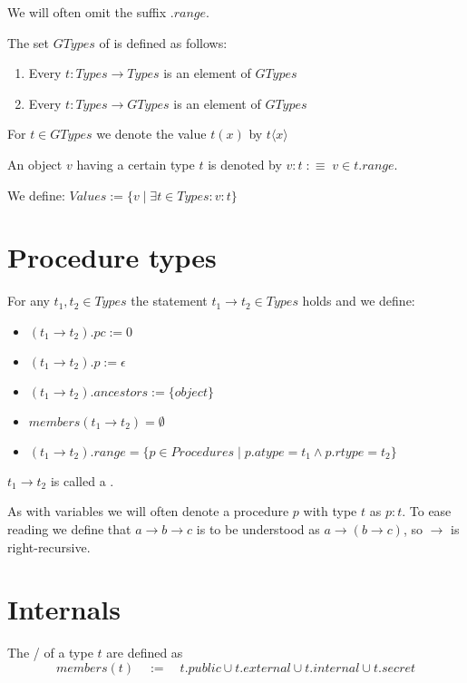 We will often omit the suffix $.range$.

The set $GTypes$ of  is defined as follows:

\begin{enumerate}
\item Every $t : Types \rightarrow Types$ is an element of $GTypes$
\item Every $t : Types \rightarrow GTypes$ is an element of $GTypes$
\end{enumerate}

For $t \in GTypes$ we denote the value $t(x)$ by $t \langle x\rangle$

An object $v$ having a certain type $t$ is denoted by $v : t \; :\equiv \; v \in t.range$.

We define: $Values := \lbrace v \mid \exists t \in Types : v : t\rbrace$

\section{Procedure types}

For any $t_1, t_2 \in Types$ the statement $t_1 \rightarrow t_2 \in Types$ holds and we define:
\begin{itemize}
\item $(t_1 \rightarrow t_2).pc := 0$ 
\item $(t_1 \rightarrow t_2).p := \epsilon$
\item $(t_1 \rightarrow t_2).ancestors := \lbrace object \rbrace$
\item $members(t_1 \rightarrow t_2) = \emptyset$
\item $(t_1 \rightarrow t_2).range = \lbrace p \in Procedures \mid p.atype = t_1 \wedge p.rtype = t_2  \rbrace$
\end{itemize}

$t_1 \rightarrow t_2$ is called a .

As with variables we will often denote a procedure $p$ with type $t$ as $ p : t$. To ease reading we define that $a \rightarrow b \rightarrow c$ is to be understood as $a \rightarrow (b \rightarrow c)$, so $\rightarrow$ is right-recursive.

\section{Internals}

The / of a type $t$ are defined as 
\[members(t) \quad := \quad t.public \cup t.external \cup t.internal \cup t.secret\]


